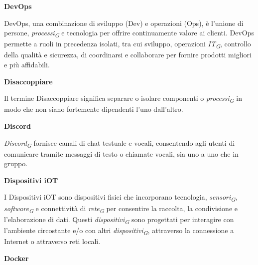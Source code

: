 \documentclass{article}
\begin{document}
\vspace{0.4cm}

\textbf{DevOps}

\vspace{0.1cm}

DevOps, una combinazione di sviluppo (Dev) e operazioni (Ops), è l'unione di persone, \textit{processi}\textsubscript{\textit{G}} e tecnologia per offrire continuamente valore ai clienti. DevOps permette a ruoli in precedenza isolati, tra cui sviluppo, operazioni \textit{IT}\textsubscript{\textit{G}}, controllo della qualità e sicurezza, di coordinarsi e collaborare per fornire prodotti migliori e più affidabili.

\vspace{0.4cm}

\textbf{Disaccoppiare}

\vspace{0.1cm}

Il termine Disaccoppiare significa separare o isolare componenti o \textit{processi}\textsubscript{\textit{G}} in modo che non siano fortemente dipendenti l'uno dall'altro.

\vspace{0.4cm}

\textbf{Discord}

\vspace{0.1cm}

\textit{Discord}\textsubscript{\textit{G}} fornisce canali di chat testuale e vocali, consentendo agli utenti di comunicare tramite messaggi di testo o chiamate vocali, sia uno a uno che in gruppo.

\vspace{0.4cm}

\textbf{Dispositivi iOT}

\vspace{0.1cm}

I Dispositivi iOT sono dispositivi fisici che incorporano tecnologia, \textit{sensori}\textsubscript{\textit{G}}, \textit{software}\textsubscript{\textit{G}} e connettività di \textit{rete}\textsubscript{\textit{G}} per consentire la raccolta, la condivisione e l'elaborazione di dati. Questi \textit{dispositivi}\textsubscript{\textit{G}} sono progettati per interagire con l'ambiente circostante e/o con altri \textit{dispositivi}\textsubscript{\textit{G}}, attraverso la connessione a Internet o attraverso reti locali.

\vspace{0.4cm}

\textbf{Docker}
\end{document}
